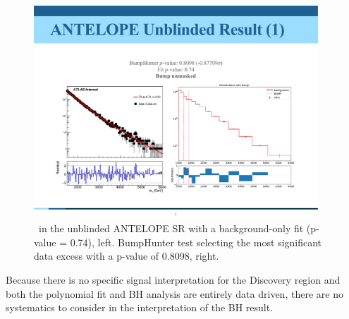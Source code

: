 \begin{figure}[!htbp]
\centering
   \includegraphics[width=0.95\textwidth]{figures/results/unblinded_antelope_unmasked}
    \caption{\mt~in the unblinded ANTELOPE SR with a background-only fit (p-value = 0.74), left. BumpHunter test selecting the most significant data excess with a p-value of 0.8098, right.
    \label{fig:unblinded_antelope_masked}}
\end{figure}

Because there is no specific signal interpretation for the Discovery region and both the polynomial fit and BH analysis are entirely data driven, there are no systematics to consider in the interpretation of the BH result.

